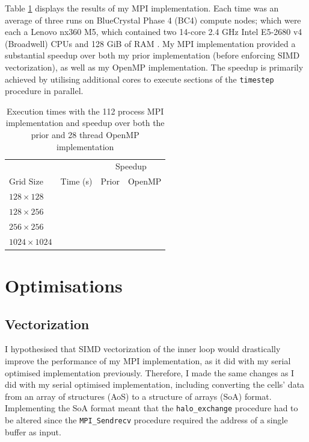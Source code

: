 \documentclass[twocolumn, a4paper]{article}
\begin{document}
Table \ref{tab:mpi} displays the results of my MPI implementation.
Each time was an average of three runs on BlueCrystal Phase 4 (BC4) compute nodes; which were each a Lenovo nx360 M5, which contained two 14-core 2.4 GHz Intel E5-2680 v4 (Broadwell) CPUs and 128 GiB of RAM \cite{bcp4}.
My MPI implementation provided a substantial speedup over both my prior implementation (before enforcing SIMD vectorization), as well as my OpenMP implementation.
The speedup is primarily achieved by utilising additional cores to execute sections of the \texttt{timestep} procedure in parallel.

\begin{table}[htbp]
  \begin{center}
  \caption{Execution times with the 112 process MPI implementation and speedup over both the prior and 28 thread OpenMP implementation}\label{tab:mpi}
  \begin{tabular}[t]{l | l  l  l} 
      \hline\hline
      &&\multicolumn{2}{c}{Speedup}\\
      \cline{3-4}
      Grid Size&Time (s)&Prior&OpenMP\\
      \hline
      $128 \times 128$&\texttt{}&\texttt{}&\texttt{}\\
      $128 \times 256$&\texttt{}&\texttt{}&\texttt{}\\
      $256 \times 256$&\texttt{}&\texttt{}&\texttt{}\\
      $1024 \times 1024$&\texttt{}&\texttt{}&\texttt{}\\
      \hline
    \end{tabular}
  \end{center}
\end{table}

\section{Optimisations}

\subsection{Vectorization}

I hypothesised that SIMD vectorization of the inner loop would drastically improve the performance of my MPI implementation, as it did with my serial optimised implementation previously.
Therefore, I made the same changes as I did with my serial optimised implementation, including converting the cells' data from an array of structures (AoS) to a structure of arrays (SoA) format.
Implementing the SoA format meant that the \texttt{halo\_exchange} procedure had to be altered since the \texttt{MPI\_Sendrecv} procedure required the address of a single buffer as input.
\end{document}
